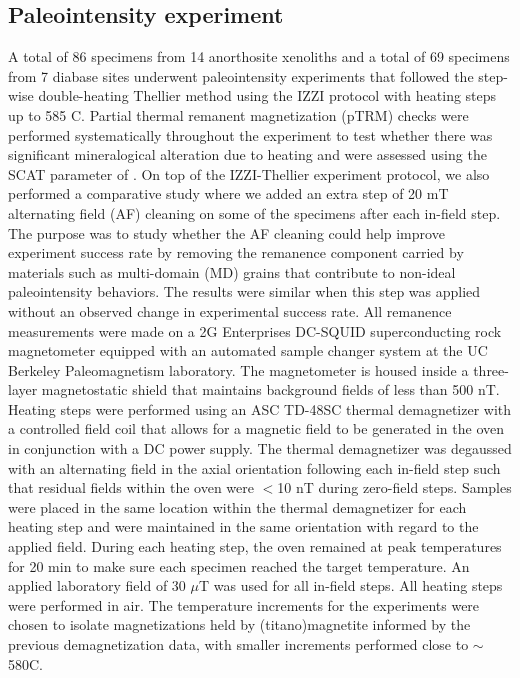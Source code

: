 \documentclass[9pt,twocolumn,twoside,lineno]{pnas-new}
\begin{document}
{\subsection*{Paleointensity experiment}
A total of 86 specimens from 14 anorthosite xenoliths and a total of 69 specimens from 7 diabase sites underwent paleointensity experiments that followed the step-wise double-heating Thellier method \cite{Thellier1959a} using the IZZI protocol \cite{Yu2004a} with heating steps up to 585 \textdegree C. Partial thermal remanent magnetization (pTRM) checks were performed systematically throughout the experiment to test whether there was significant mineralogical alteration due to heating and were assessed using the SCAT parameter of  \citealp{Shaar2013a}. On top of the IZZI-Thellier experiment protocol, we also performed a comparative study where we added an extra step of 20 mT alternating field (AF) cleaning on some of the specimens after each in-field step. The purpose was to study whether the AF cleaning could help improve experiment success rate by removing the remanence component carried by materials such as multi-domain (MD) grains that contribute to non-ideal paleointensity behaviors. The results were similar when this step was applied without an observed change in experimental success rate. All remanence measurements were made on a 2G Enterprises DC-SQUID superconducting rock magnetometer equipped with an automated sample changer system at the UC Berkeley Paleomagnetism laboratory. The magnetometer is housed inside a three-layer magnetostatic shield that maintains background fields of less than 500 nT. Heating steps were performed using an ASC TD-48SC thermal demagnetizer with a controlled field coil that allows for a magnetic field to be generated in the oven in conjunction with a DC power supply. The thermal demagnetizer was degaussed with an alternating field in the axial orientation following each in-field step such that residual fields within the oven were $<$10 nT during zero-field steps. Samples were placed in the same location within the thermal demagnetizer for each heating step and were maintained in the same orientation with regard to the applied field. During each heating step, the oven remained at peak temperatures for 20 min to make sure each specimen reached the target temperature. An applied laboratory field of 30 $\mu$T was used for all in-field steps. All heating steps were performed in air. The temperature increments for the experiments were chosen to isolate magnetizations held by (titano)magnetite informed by the previous demagnetization data, with smaller increments performed close to $\sim$580\textdegree C. 

}
\end{document}
